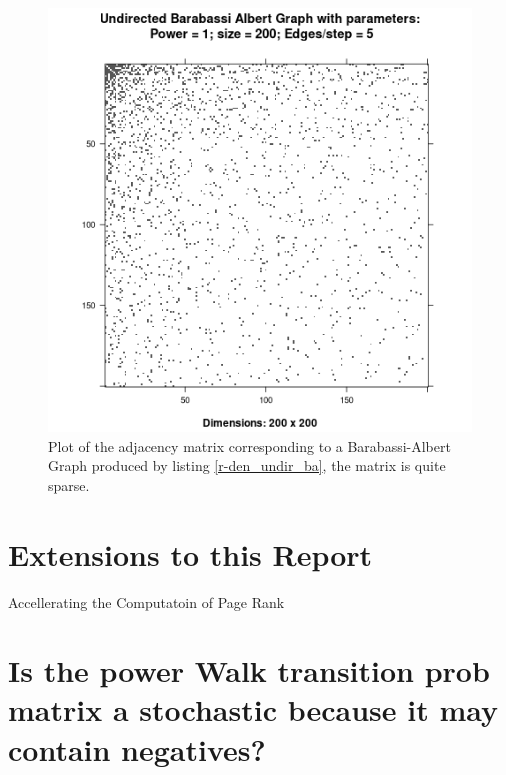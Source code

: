 \documentclass[11pt]{article}
\begin{document}
\begin{figure}[htbp]
\centering
\includegraphics[width=12cm]{media/DensityUndirectedBA.png}
\caption{\label{fig:den_undir_ba}Plot of the adjacency matrix corresponding to a Barabassi-Albert Graph produced by listing \ref{r-den_undir_ba}, the matrix is quite sparse.}
\end{figure}
\section{Extensions to this Report}
\label{sec:org4dc4966}
Accellerating the Computatoin of Page Rank \cite{langvilleGooglePageRankScience2012}

\section{Is the power Walk transition prob matrix a stochastic because it may contain negatives?}
\label{sec:org8dbf1fa}
\end{document}

